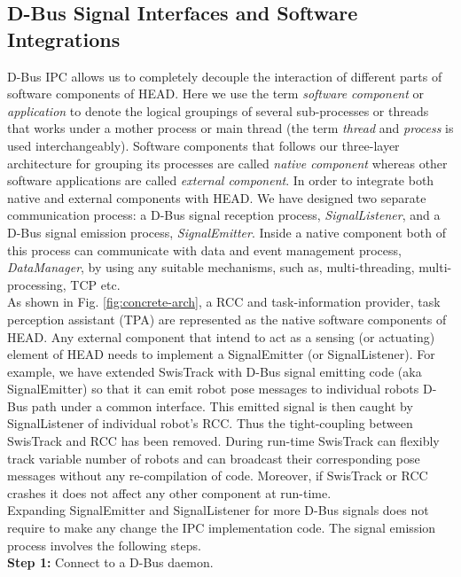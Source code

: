 \documentclass[draft]{ifacconf}
\begin{document}
\subsection{D-Bus Signal Interfaces and Software Integrations}
D-Bus IPC allows us to completely decouple the interaction of different parts of software components of HEAD. Here we use the term {\em software component} or {\em application} to denote the logical groupings of several sub-processes or threads that works under a mother process or main thread (the term {\em thread} and {\em process} is used interchangeably). Software components that follows our three-layer architecture for grouping its processes are called {\em native component} whereas other software applications are called {\em external component}. In order to integrate both native and external components with HEAD. We have designed two separate communication process: a D-Bus signal reception process, {\em SignalListener}, and a D-Bus signal emission process, {\em SignalEmitter}. Inside a native component both of this process can communicate with data and event management process, {\em DataManager}, by using any suitable mechanisms, such as, multi-threading, multi-processing, TCP etc.\\
 As shown in Fig. \ref{fig:concrete-arch}, a RCC and task-information provider, task perception assistant (TPA) are represented as the native software components of HEAD. Any external component that intend to act as a sensing (or actuating) element of HEAD needs to implement a SignalEmitter (or SignalListener). For example, we have extended SwisTrack  with D-Bus signal emitting code (aka SignalEmitter) so that it can emit robot pose messages to individual robots D-Bus path under a common interface. This emitted signal is then caught by SignalListener of individual robot's RCC. Thus the tight-coupling between SwisTrack and RCC has been removed. During run-time SwisTrack can flexibly track variable number of robots and can broadcast their corresponding pose messages without any re-compilation of code. Moreover, if SwisTrack or RCC crashes it does not affect any other component at run-time.\\
Expanding SignalEmitter and SignalListener for more D-Bus signals does not require to make any change the IPC implementation code. The signal emission process involves the following steps.\\
\textbf{Step 1:} Connect to a D-Bus daemon. \\
\end{document}
